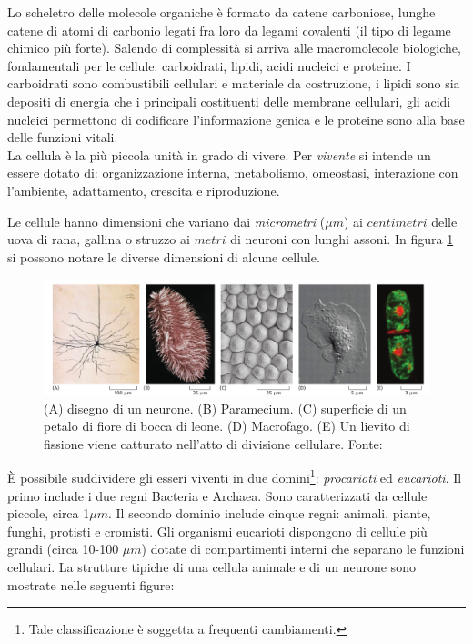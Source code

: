 \par Lo scheletro delle molecole organiche è formato da catene carboniose, lunghe catene di atomi di carbonio legati fra loro da legami covalenti (il tipo di legame chimico più forte). Salendo di complessità si arriva alle macromolecole biologiche, fondamentali per le cellule: carboidrati, lipidi, acidi nucleici e proteine. I carboidrati sono combustibili cellulari e materiale da costruzione, i lipidi sono sia depositi di energia che i principali costituenti delle membrane cellulari, gli acidi nucleici permettono di codificare l'informazione genica e le proteine sono alla base delle funzioni vitali.\\

La cellula è la più piccola unità in grado di vivere. Per \textit{vivente} si intende un essere dotato di: organizzazione interna, metabolismo, omeostasi, interazione con l'ambiente, adattamento, crescita e riproduzione.

\par Le cellule hanno dimensioni che variano dai \textit{micrometri} ($\mu m$) ai $centimetri$ delle uova di rana, gallina o struzzo ai $metri$ di neuroni con lunghi assoni. In figura \ref{fig:cellule-dimensioni} si possono notare le diverse dimensioni di alcune cellule.

\begin{figure}[!h]
	\centering
	\includegraphics[scale=0.5] {images/cellule-dimensioni.png}
	\caption{(A) disegno di un neurone. (B) Paramecium. (C) superficie di un petalo di fiore di bocca di leone. (D) Macrofago. (E) Un lievito di fissione viene catturato nell'atto di divisione cellulare. Fonte: \cite{alberts2018essential}}
	\label{fig:cellule-dimensioni}
\end{figure}

\par È possibile suddividere gli esseri viventi in due domini\footnote{Tale classificazione è soggetta a frequenti cambiamenti.}: \textit{procarioti} ed \textit{eucarioti}. Il primo include i due regni Bacteria e Archaea. Sono caratterizzati da cellule piccole, circa 1$\mu m$. Il secondo dominio include cinque regni: animali, piante, funghi, protisti e cromisti. Gli organismi eucarioti dispongono di cellule più grandi (circa 10-100 $\mu m$) dotate di compartimenti interni che separano le funzioni cellulari. La strutture tipiche di una cellula animale e di un neurone sono mostrate nelle seguenti figure:

